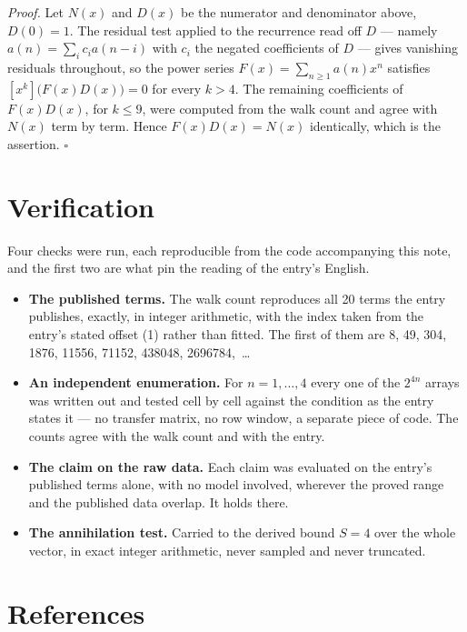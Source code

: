 \documentclass[11pt]{article}
\theoremstyle{definition}
\begin{document}
{\itshape Proof.} Let $N(x)$ and $D(x)$ be the numerator and denominator above, $D(0)=1$. The residual test applied to the recurrence read off $D$ --- namely $a(n) = \sum_i c_i a(n-i)$ with $c_i$ the negated coefficients of $D$ --- gives vanishing residuals throughout, so the power series $F(x)=\sum_{n\ge 1}a(n)x^n$ satisfies $[x^k]\bigl(F(x)D(x)\bigr) = 0$ for every $k > 4$. The remaining coefficients of $F(x)D(x)$, for $k \le 9$, were computed from the walk count and agree with $N(x)$ term by term. Hence $F(x)D(x) = N(x)$ identically, which is the assertion. $\square$

\section{Verification}

Four checks were run, each reproducible from the code accompanying this note, and the first two are what pin the reading of the entry's English.

\begin{itemize}

\item {\bfseries The published terms.} The walk count reproduces all 20 terms the entry publishes, exactly, in integer arithmetic, with the index taken from the entry's stated offset (1) rather than fitted. The first of them are 8, 49, 304, 1876, 11556, 71152, 438048, 2696784,~\dots

\item {\bfseries An independent enumeration.} For $n = 1,\dots,4$ every one of the $2^{4n}$ arrays was written out and tested cell by cell against the condition as the entry states it --- no transfer matrix, no row window, a separate piece of code. The counts agree with the walk count and with the entry.

\item {\bfseries The claim on the raw data.} Each claim was evaluated on the entry's published terms alone, with no model involved, wherever the proved range and the published data overlap. It holds there.

\item {\bfseries The annihilation test.} Carried to the derived bound $S = 4$ over the whole vector, in exact integer arithmetic, never sampled and never truncated.

\end{itemize}

\section{References}
\end{document}
